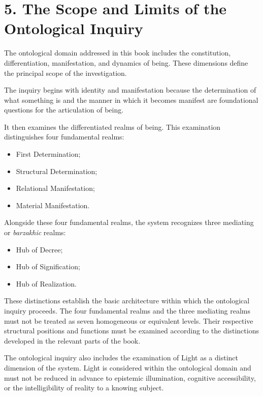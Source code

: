 
\section*{5. The Scope and Limits of the Ontological Inquiry}

The ontological domain addressed in this book includes
the constitution, differentiation, manifestation, and
dynamics of being. These dimensions define the principal
scope of the investigation.

The inquiry begins with identity and manifestation
because the determination of what something is and
the manner in which it becomes manifest are foundational
questions for the articulation of being.

It then examines the differentiated realms of being.
This examination distinguishes four fundamental realms:

\begin{itemize}
    \item First Determination;
    \item Structural Determination;
    \item Relational Manifestation;
    \item Material Manifestation.
\end{itemize}

Alongside these four fundamental realms, the system
recognizes three mediating or \textit{barzakhic} realms:

\begin{itemize}
    \item Hub of Decree;
    \item Hub of Signification;
    \item Hub of Realization.
\end{itemize}

These distinctions establish the basic architecture
within which the ontological inquiry proceeds. The
four fundamental realms and the three mediating realms
must not be treated as seven homogeneous or equivalent
levels. Their respective structural positions and
functions must be examined according to the distinctions
developed in the relevant parts of the book.

The ontological inquiry also includes the examination
of Light as a distinct dimension of the system. Light
is considered within the ontological domain and must
not be reduced in advance to epistemic illumination,
cognitive accessibility, or the intelligibility of
reality to a knowing subject.

